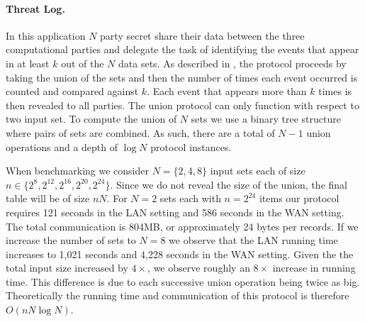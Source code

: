 \paragraph{Threat Log. } In this application $N$ party secret share their data between the three computational parties and delegate the task of identifying the events that appear in at least $k$ out of the $N$ data sets. As described in , the protocol proceeds by taking the union of the sets and then the number of times each event occurred is counted and compared against $k$. Each event that appears more than $k$ times is then revealed to all parties. The union protocol can only function with respect to two input set. To compute the union of $N$ sets we use a binary tree structure where pairs of sets are combined. As such, there are a total of $N-1$ union operations and a depth of $\log N$ protocol instances.

When benchmarking we consider $N=\{2,4,8\}$ input sets each of size $n\in \{2^8, 2^{12}, 2^{16}, 2^{20}, 2^{24}\}$. Since we do not reveal the size of the union, the final table will be of size $nN$. For $N=2$ sets each with $n=2^{24}$ items our protocol requires 121 seconds in the LAN setting and 586 seconds in the WAN setting. The total communication is 804MB, or approximately 24 bytes per records. If we increase the number of sets to $N=8$ we observe that the LAN running time increases to 1,021 seconds and 4,228 seconds  in the WAN setting. Given the the total input size increased by $4\times$, we observe roughly an $8\times$ increase in running time. This difference is due to each successive union operation being twice as big. Theoretically the running time and communication of this protocol is therefore $O(nN\log N)$.

